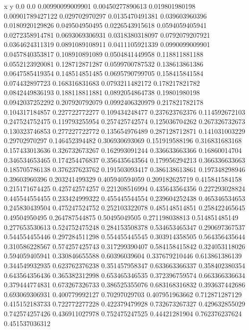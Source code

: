               x                y
            0.0              0.0
0.00990099009901  0.00450277890613
 0.019801980198  0.00901789427122
 0.029702970297  0.0135470491381
 0.039603960396  0.0180920129826
 0.049504950495  0.0226543915618
0.0594059405941  0.0272358914781
0.0693069306931  0.0318380318097
0.0792079207921  0.0364624311319
0.0891089108911  0.0411105921339
0.0990099009901  0.0457840353817
 0.108910891089  0.0504841449958
 0.118811881188  0.0552123920081
 0.128712871287  0.0599700787532
 0.138613861386  0.0647585419354
 0.148514851485  0.0695790799705
 0.158415841584   0.074432897723
 0.168316831683  0.0793211482172
 0.178217821782  0.0842449836193
 0.188118811881  0.0892054864738
  0.19801980198  0.0942037252292
 0.207920792079  0.0992406320979
 0.217821782178   0.104317184857
 0.227722772277   0.109434248477
 0.237623762376   0.114592672103
 0.247524752475   0.119793255954
 0.257425742574   0.125036704262
 0.267326732673   0.130323746853
 0.277227722772   0.135654976489
 0.287128712871   0.141031003229
  0.29702970297   0.146452394482
 0.306930693069   0.151919588196
 0.316831683168   0.157433013636
 0.326732673267   0.162993091244
 0.336633663366    0.16860014704
 0.346534653465   0.174254476837
 0.356435643564   0.179956294213
 0.366336633663   0.185705786138
 0.376237623762   0.191503093417
 0.386138613861   0.197348298946
  0.39603960396   0.203241499329
 0.405940594059   0.209182625719
 0.415841584158   0.215171674425
 0.425742574257   0.221208516994
 0.435643564356   0.227293028824
 0.445544554455   0.233424999322
 0.455445544554   0.239604252438
 0.465346534653   0.245830439504
 0.475247524752   0.252103322078
 0.485148514851   0.258422465645
  0.49504950495   0.264787544875
  0.50495049505   0.271198038813
 0.514851485149   0.277653530613
 0.524752475248   0.284153508378
 0.534653465347   0.290697367537
 0.544554455446   0.297284511298
 0.554455445545   0.303914358505
 0.564356435644   0.310586228567
 0.574257425743   0.317299390407
 0.584158415842   0.324053118026
 0.594059405941   0.330846655588
  0.60396039604   0.337679210446
 0.613861386139   0.344549932935
 0.623762376238   0.351457958347
 0.633663366337   0.358402380354
 0.643564356436   0.365382312998
 0.653465346535   0.372396759574
 0.663366336634   0.379444774831
 0.673267326733   0.386525355076
 0.683168316832   0.393637442686
 0.693069306931   0.400779992127
  0.70297029703   0.407951963662
 0.712871287129   0.415152183733
 0.722772277228   0.422379479928
 0.732673267327   0.429632855029
 0.742574257426   0.436911027978
 0.752475247525    0.44421281904
 0.762376237624   0.451537036312
